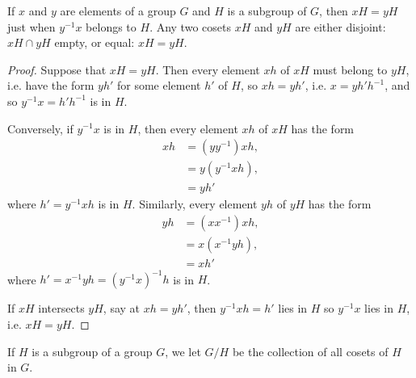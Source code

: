\begin{lemma}\label{lemma:coset.id}
If \(x\) and \(y\) are elements of a group \(G\) and \(H\) is a subgroup of \(G\), then \(xH=yH\) just when \(y^{-1}x\) belongs to \(H\).
Any two cosets \(xH\) and \(yH\) are either disjoint: \(xH \cap yH\) empty, or equal: \(xH=yH\).
\end{lemma}
\begin{proof}
Suppose that \(xH=yH\).
Then every element \(xh\) of \(xH\) must belong to \(yH\), i.e. have the form \(yh'\) for some element \(h'\) of \(H\), so \(xh=yh'\), i.e. \(x=yh'h^{-1}\), and so \(y^{-1}x=h'h^{-1}\) is in \(H\).

Conversely, if \(y^{-1}x\) is in \(H\), then every element \(xh\) of \(xH\) has the form
\begin{align*}
xh
&=
(yy^{-1})xh, \\
&=
y(y^{-1}xh),
\\
&= yh'
\end{align*}
where \(h' = y^{-1}xh\) is in \(H\).
Similarly, every element \(yh\) of \(yH\) has the form
\begin{align*}
yh
&=
(xx^{-1})xh, \\
&=
x(x^{-1}yh),
\\
&= xh'
\end{align*}
where \(h' = x^{-1}yh = (y^{-1}x)^{-1}h\) is in \(H\).

If \(xH\) intersects \(yH\), say at \(xh=yh'\), then \(y^{-1}xh=h'\) lies in \(H\) so \(y^{-1}x\) lies in \(H\), i.e. \(xH=yH\).
\end{proof}


If \(H\) is a subgroup of a group \(G\), we let \(G/H\) be the collection of all cosets of \(H\) in \(G\).

